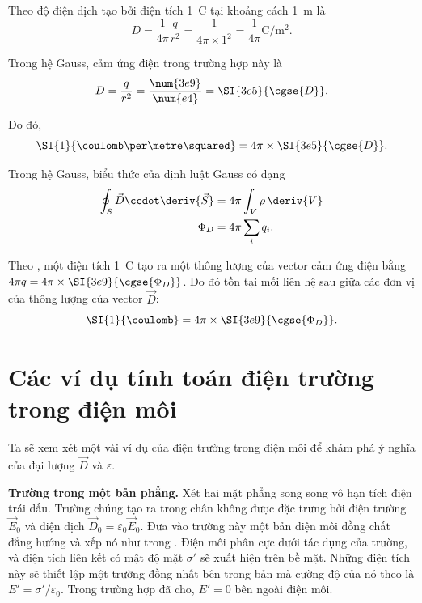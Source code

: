 Theo  độ điện dịch tạo bởi điện tích \SI{1}{\coulomb} tại khoảng cách \SI{1}{\metre} là
\begin{equation*}
    D = \frac{1}{4\pi}\frac{q}{r^2} = \frac{1}{4\pi\times 1^2} = \frac{1}{4\pi} \si{\coulomb\per\metre\squared}.
\end{equation*}

\noindent
Trong hệ Gauss, cảm ứng điện trong trường hợp này là
\begin{equation*}
    D = \frac{q}{r^2} = \frac{\num{3e9}}{\num{e4}} = \SI{3e5}{\cgse{D}}.
\end{equation*}

\noindent
Do đó,
\begin{equation*}
    \SI{1}{\coulomb\per\metre\squared} = 4\pi \times  \SI{3e5}{\cgse{D}}.
\end{equation*}

Trong hệ Gauss, biểu thức của định luật Gauss có dạng
\begin{align}
    \oint_S \vec{D} \ccdot \deriv{\vec{S}} &= 4\pi \int_V \rho\, \deriv{V}\label{eq:2_30}\\
    \Phi_D &= 4\pi \sum_i q_i.\label{eq:2_31}
\end{align}

\noindent
Theo , một điện tích \SI{1}{\coulomb} tạo ra một thông lượng của vector cảm ứng điện bằng $4\pi q=4\pi\times\SI{3e9}{\cgse{\Phi_D}}$. Do đó tồn tại mối liên hệ sau giữa các đơn vị của thông lượng của vector $\vec{D}$:
\begin{equation*}
    \SI{1}{\coulomb} = 4\pi \times \SI{3e9}{\cgse{\Phi_D}}.
\end{equation*}

\section{Các ví dụ tính toán điện trường trong điện môi}\label{sec:2_6}

Ta sẽ xem xét một vài ví dụ của điện trường trong điện môi để khám phá ý nghĩa của đại lượng $\vec{D}$ và $\varepsilon$.

\textbf{Trường trong một bản phẳng.} Xét hai mặt phẳng song song vô hạn tích điện trái dấu. Trường chúng tạo ra trong chân không được đặc trưng bởi điện trường $\vec{E}_0$ và điện dịch $\vec{D}_0=\varepsilon_0\vec{E}_0$. Đưa vào trường này một bản điện môi đồng chất đẳng hướng và xếp nó như trong . Điện môi phân cực dưới tác dụng của trường, và điện tích liên kết có mật độ mặt $\sigma'$ sẽ xuất hiện trên bề mặt. Những điện tích này sẽ thiết lập một trường đồng nhất bên trong bản mà cường độ của nó theo  là $E'=\sigma'/\varepsilon_0$. Trong trường hợp đã cho, $E'=0$ bên ngoài điện môi.

